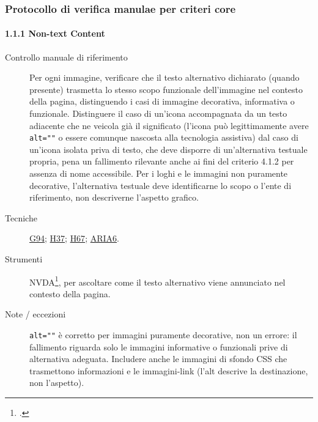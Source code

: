 \subsubsection{Protocollo di verifica manulae per criteri core}

\paragraph*{1.1.1 Non-text Content}
\begin{description}
\item[Controllo manuale di riferimento] Per ogni immagine, verificare che il testo alternativo dichiarato (quando presente) trasmetta lo stesso scopo funzionale dell'immagine nel contesto della pagina, distinguendo i casi di immagine decorativa, informativa o funzionale. Distinguere il caso di un'icona accompagnata da un testo adiacente che ne veicola già il significato (l'icona può legittimamente avere \texttt{alt=""} o essere comunque nascosta alla tecnologia assistiva) dal caso di un'icona isolata priva di testo, che deve disporre di un'alternativa testuale propria, pena un fallimento rilevante anche ai fini del criterio 4.1.2 per assenza di nome accessibile. Per i loghi e le immagini non puramente decorative, l'alternativa testuale deve identificarne lo scopo o l'ente di riferimento, non descriverne l'aspetto grafico.
\item[Tecniche] \href{https://www.w3.org/WAI/WCAG21/Techniques/general/G94.html}{G94}; \href{https://www.w3.org/WAI/WCAG21/Techniques/html/H37.html}{H37};
\href{https://www.w3.org/WAI/WCAG22/Techniques/html/H67}{H67}; \href{https://www.w3.org/WAI/WCAG21/Techniques/aria/ARIA6.html}{ARIA6}.
\item[Strumenti] NVDA\footcite{nvda:screenreader}, per ascoltare come il testo alternativo viene annunciato nel contesto della pagina.
\item[Note / eccezioni] \texttt{alt=""} è corretto per immagini puramente decorative, non un errore: il fallimento riguarda solo le immagini informative o funzionali prive di alternativa adeguata. Includere anche le immagini di sfondo CSS che trasmettono informazioni e le immagini-link (l'alt descrive la destinazione, non l'aspetto).
\end{description}

